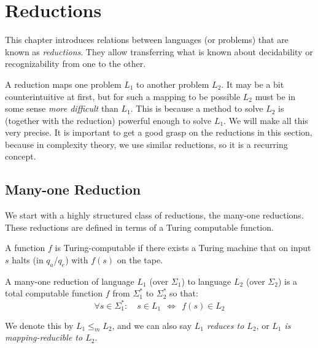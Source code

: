 \chapter{Reductions}

This chapter introduces relations between languages (or problems)
that are known as \emph{reductions}. They allow transferring
what is known about decidability or recognizability from one to
the other.

A reduction maps one problem $L_1$ to another problem $L_2$. 
It may be a bit counterintuitive at first, but for such
a mapping to be possible $L_2$ must be in some sense {\em more difficult}
than $L_1$. This is because a method to solve $L_2$ is (together with the reduction) powerful
enough to solve $L_1$. We will make all this very precise. It is important
to get a good grasp on the reductions in this section, because in complexity
theory, we use similar reductions, so it is a recurring concept.

\section{Many-one Reduction}\label{mappingreduction}

We start with a highly structured class of reductions, the many-one reductions.
These reductions are defined in terms of a Turing computable function.

\begin{definition}
A function $f$ is Turing-computable if there exists a Turing machine that on input $s$
halts (in $q_a$/$q_e$) with $f(s)$ on the tape.
\end{definition}

\begin{definition} \label{manyone}
A many-one reduction of language $L_1$ (over $\Sigma_1$) to language
$L_2$ (over $\Sigma_2$) is a total computable function $f$ from
$\Sigma_1^*$ to $\Sigma_2^*$ so that: 
\begin{equation*}
\forall s \in \Sigma_1^*: \quad s \in L_1 ~~\Leftrightarrow~~ f(s) \in L_2
\end{equation*}

We denote this by $L_1 \leq_m L_2$, and we can also say {\em $L_1$
  reduces to $L_2$}, or {\em $L_1$ is mapping-reducible to $L_2$}.
\end{definition}

